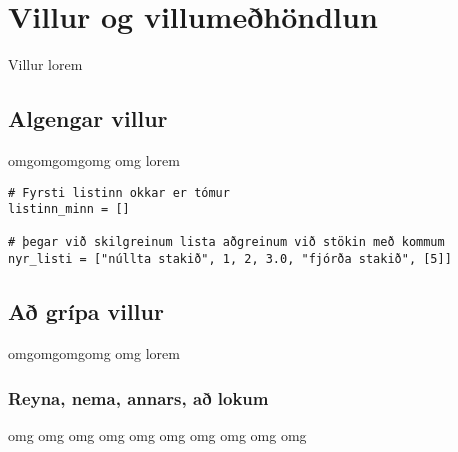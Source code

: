 
\chapter{Villur og villumeðhöndlun}\label{k:villur}
Villur lorem

\section{Algengar villur}\label{uk:villur-algengar}
omgomgomgomg omg lorem

\begin{lstlisting}[caption=Nokkrar algengar villur, label=lst:villur-kynntar]
# Fyrsti listinn okkar er tómur
listinn_minn = []

# þegar við skilgreinum lista aðgreinum við stökin með kommum
nyr_listi = ["núllta stakið", 1, 2, 3.0, "fjórða stakið", [5]]
\end{lstlisting}

\section{Að grípa villur}\label{uk:villur-grípa}
omgomgomgomg omg lorem

\subsection{Reyna, nema, annars, að lokum}\label{uk:villur-try}
omg omg omg omg omg omg omg omg omg omg
